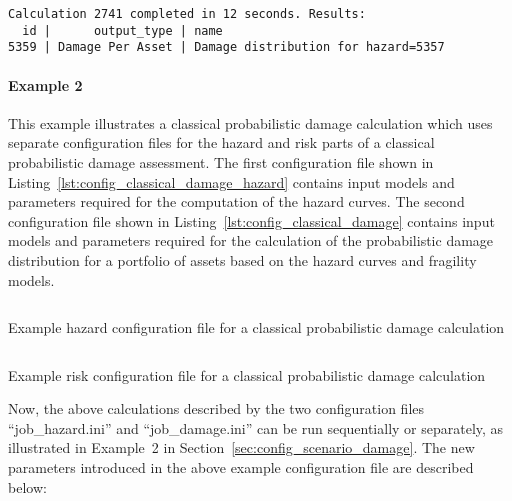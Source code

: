\begin{verbatim}
Calculation 2741 completed in 12 seconds. Results:
  id |      output_type | name
5359 | Damage Per Asset | Damage distribution for hazard=5357
\end{verbatim}


\paragraph{Example 2}

This example illustrates a classical probabilistic damage calculation which
uses separate configuration files for the hazard and risk parts of a classical
probabilistic damage assessment. The first configuration file shown in
Listing~\ref{lst:config_classical_damage_hazard} contains input models and parameters
required for the computation of the hazard curves. The second configuration
file shown in Listing~\ref{lst:config_classical_damage} contains input models
and parameters required for the calculation of the probabilistic damage
distribution for a portfolio of assets based on the hazard curves and
fragility models.

\begin{listing}[htbp]
  \inputminted[firstline=1,firstnumber=1,fontsize=\footnotesize,frame=single,linenos,bgcolor=lightgray,label=job\_hazard.ini]{ini}{oqum/risk/verbatim/config_classical_hazard.ini}
  \caption{Example hazard configuration file for a classical probabilistic damage calculation}
  \label{lst:config_classical_damage_hazard}
\end{listing}

\begin{listing}[htbp]
  \inputminted[firstline=1,firstnumber=1,fontsize=\footnotesize,frame=single,linenos,bgcolor=lightgray,label=job\_damage.ini]{ini}{oqum/risk/verbatim/config_classical_damage.ini}
  \caption{Example risk configuration file for a classical probabilistic damage calculation}
  \label{lst:config_classical_damage}
\end{listing}

Now, the above calculations described by the two configuration files
``job\_hazard.ini'' and ``job\_damage.ini'' can be run sequentially or
separately, as illustrated in Example~2 in
Section~\ref{sec:config_scenario_damage}. The new parameters introduced in the
above example configuration file are described below:

